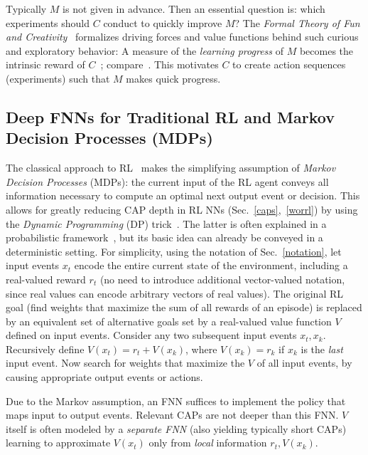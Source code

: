 \documentclass[letterpaper]{article}
\begin{document}
\begin{CJK*}{UTF8}{gbsn}
Typically $M$ is not given in advance. Then 
an essential question is: which experiments should $C$ conduct to quickly improve $M$?
The {\em Formal Theory of Fun and Creativity}~\citep[e.g.,][]{Schmidhuber:06cs,Schmidhuber:13powerplay}
 formalizes driving forces and value functions behind such curious and exploratory behavior: 
A measure of the {\em learning progress} of $M$ becomes the intrinsic reward of $C$~\citep{Schmidhuber:91singaporecur}; compare~\citep{Singh:05nips,Oudeyer:12intrinsic}.
This motivates $C$ to create action sequences (experiments) such that $M$ makes quick progress.



\subsection{Deep FNNs for Traditional RL and Markov Decision Processes (MDPs)}
\label{trarl}

The classical
approach to RL~\citep{Samuel:59,Bertsekas:96} makes the simplifying 
assumption of {\em Markov Decision Processes} (MDPs): 
the current input of the RL agent
conveys all information necessary to compute an optimal next 
output event or decision. 
This allows for greatly reducing CAP depth in RL NNs (Sec.~\ref{caps},~\ref{worrl}) 
by using the {\em Dynamic Programming} (DP) trick~\citep{Bellman:1957}.
The latter is often explained in a probabilistic framework~\citep[e.g.,][]{Sutton:98}, 
but its basic idea can already be conveyed in a deterministic setting.
For simplicity, 
using the notation of Sec.~\ref{notation},
let input events $x_t$ encode the entire current state of
the environment, including a real-valued reward $r_t$
(no need to introduce additional vector-valued notation, 
since real values can encode arbitrary vectors of real values).
The original RL goal (find weights that maximize the sum of all rewards of an episode) 
is replaced by an equivalent set of alternative goals set by a
real-valued value function $V$ defined on input events.
Consider any two subsequent input events $x_t,x_k$.
Recursively define $V(x_t)=r_t+V(x_k)$, where $V(x_k)=r_k$ if $x_k$ is the {\em last} input event.
Now search for weights that maximize the $V$ 
of all input events, 
by causing appropriate output events or actions. 

Due to the Markov assumption,
an FNN suffices to implement the policy that maps input to output events.
Relevant CAPs are not deeper than this FNN. 
$V$ itself is often modeled by a {\em separate FNN} (also yielding typically short CAPs) 
learning to approximate $V(x_t)$ 
only from {\em local} information $r_t, V(x_k)$.


\end{CJK*}
\end{document}

